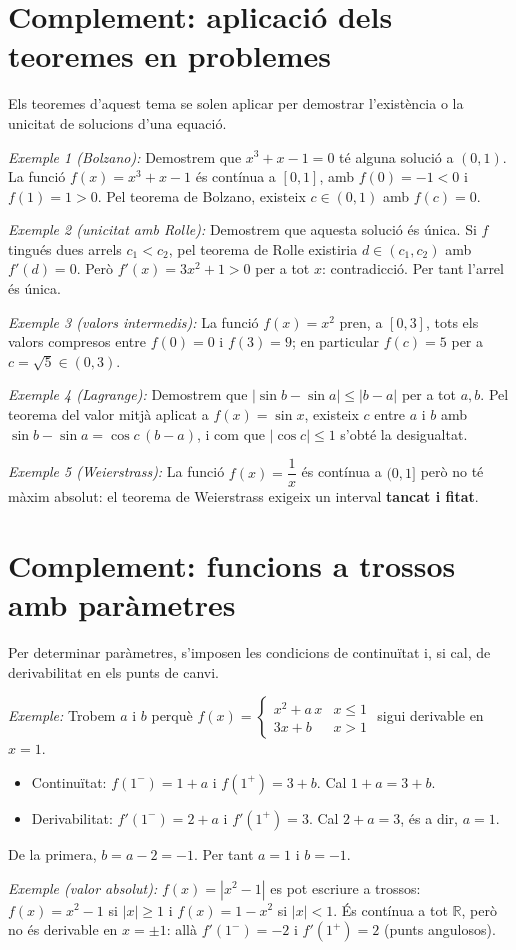 \section{Complement: aplicació dels teoremes en problemes}

Els teoremes d'aquest tema se solen aplicar per demostrar l'existència o la unicitat de solucions d'una equació.

\emph{Exemple 1 (Bolzano):} Demostrem que $x^3+x-1=0$ té alguna solució a $(0,1)$. La funció $f(x)=x^3+x-1$ és contínua a $[0,1]$, amb $f(0)=-1<0$ i $f(1)=1>0$. Pel teorema de Bolzano, existeix $c\in(0,1)$ amb $f(c)=0$.

\emph{Exemple 2 (unicitat amb Rolle):} Demostrem que aquesta solució és única. Si $f$ tingués dues arrels $c_1<c_2$, pel teorema de Rolle existiria $d\in(c_1,c_2)$ amb $f'(d)=0$. Però $f'(x)=3x^2+1>0$ per a tot $x$: contradicció. Per tant l'arrel és única.

\emph{Exemple 3 (valors intermedis):} La funció $f(x)=x^2$ pren, a $[0,3]$, tots els valors compresos entre $f(0)=0$ i $f(3)=9$; en particular $f(c)=5$ per a $c=\sqrt5\in(0,3)$.

\emph{Exemple 4 (Lagrange):} Demostrem que $|\sin b-\sin a|\le|b-a|$ per a tot $a,b$. Pel teorema del valor mitjà aplicat a $f(x)=\sin x$, existeix $c$ entre $a$ i $b$ amb $\sin b-\sin a=\cos c\,(b-a)$, i com que $|\cos c|\le1$ s'obté la desigualtat.

\emph{Exemple 5 (Weierstrass):} La funció $f(x)=\dfrac1x$ és contínua a $(0,1]$ però no té màxim absolut: el teorema de Weierstrass exigeix un interval \textbf{tancat i fitat}.

\section{Complement: funcions a trossos amb paràmetres}

Per determinar paràmetres, s'imposen les condicions de continuïtat i, si cal, de derivabilitat en els punts de canvi.

\emph{Exemple:} Trobem $a$ i $b$ perquè $f(x)=\begin{cases}x^2+a\,x & x\le1\\ 3x+b & x>1\end{cases}$ sigui derivable en $x=1$.

\begin{itemize}
\item Continuïtat: $f(1^-)=1+a$ i $f(1^+)=3+b$. Cal $1+a=3+b$.
\item Derivabilitat: $f'(1^-)=2+a$ i $f'(1^+)=3$. Cal $2+a=3$, és a dir, $a=1$.
\end{itemize}

De la primera, $b=a-2=-1$. Per tant $a=1$ i $b=-1$.

\emph{Exemple (valor absolut):} $f(x)=|x^2-1|$ es pot escriure a trossos: $f(x)=x^2-1$ si $|x|\ge1$ i $f(x)=1-x^2$ si $|x|<1$. És contínua a tot $\mathbb R$, però no és derivable en $x=\pm1$: allà $f'(1^-)=-2$ i $f'(1^+)=2$ (punts angulosos).
